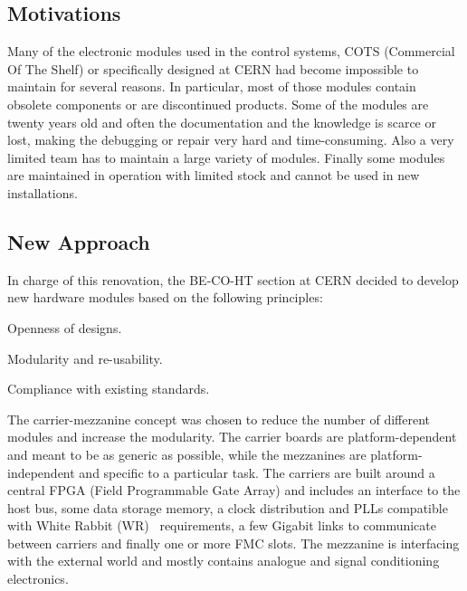 \documentclass{JAC2003}
\begin{document}
\subsection{Motivations}
Many of the electronic modules used in the control systems, COTS (Commercial Of The Shelf) or specifically designed at CERN had become impossible to maintain for several reasons.
In particular, most of those modules contain obsolete components or are discontinued products.
Some of the modules are twenty years old and often the documentation and the knowledge is scarce or lost, making the debugging or repair very hard and time-consuming.
Also a very limited team has to maintain a large variety of modules.
Finally some modules are maintained in operation with limited stock and cannot be used in new installations.

\subsection{New Approach}
In charge of this renovation, the BE-CO-HT section at CERN decided to develop new hardware modules based on the following principles:
\begin{Itemize}
\item Openness of designs.
\item Modularity and re-usability.
\item Compliance with existing standards.
\end{Itemize}

The carrier-mezzanine concept was chosen to reduce the number of different modules and increase the modularity.
The carrier boards are platform-dependent and meant to be as generic as possible, while the mezzanines are platform-independent and specific to a particular task.
The carriers are built around a central FPGA (Field Programmable Gate Array) and includes an interface to the host bus, some data storage memory, a clock distribution and PLLs compatible with White Rabbit (WR)~\cite{wr} requirements, a few Gigabit links to communicate between carriers and finally one or more FMC slots.
The mezzanine is interfacing with the external world and mostly contains analogue and signal conditioning electronics.
\end{document}
